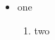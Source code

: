 \begin{itemize}
\item one
\begin{enumerate}[label=(\alph*)]
\item two
\end{enumerate}
\end{itemize}
